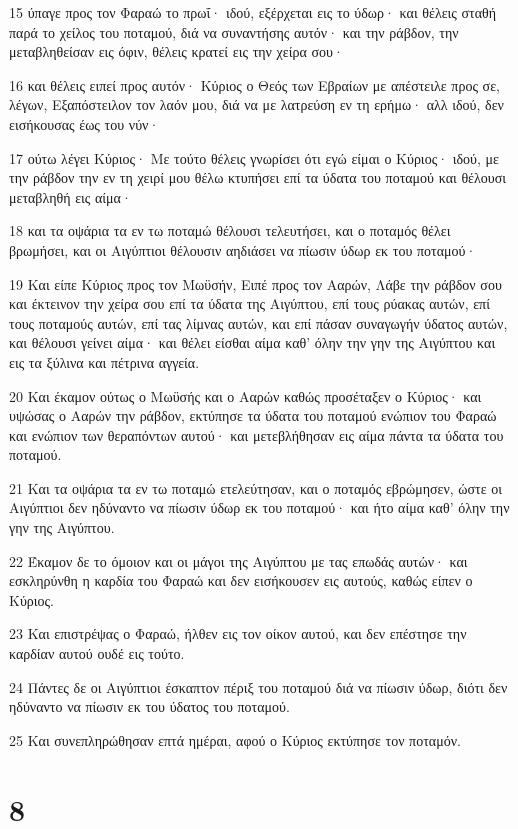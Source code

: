 \par 15 ύπαγε προς τον Φαραώ το πρωΐ· ιδού, εξέρχεται εις το ύδωρ· και θέλεις σταθή παρά το χείλος του ποταμού, διά να συναντήσης αυτόν· και την ράβδον, την μεταβληθείσαν εις όφιν, θέλεις κρατεί εις την χείρα σου·
\par 16 και θέλεις ειπεί προς αυτόν· Κύριος ο Θεός των Εβραίων με απέστειλε προς σε, λέγων, Εξαπόστειλον τον λαόν μου, διά να με λατρεύση εν τη ερήμω· αλλ ιδού, δεν εισήκουσας έως του νύν·
\par 17 ούτω λέγει Κύριος· Με τούτο θέλεις γνωρίσει ότι εγώ είμαι ο Κύριος· ιδού, με την ράβδον την εν τη χειρί μου θέλω κτυπήσει επί τα ύδατα του ποταμού και θέλουσι μεταβληθή εις αίμα·
\par 18 και τα οψάρια τα εν τω ποταμώ θέλουσι τελευτήσει, και ο ποταμός θέλει βρωμήσει, και οι Αιγύπτιοι θέλουσιν αηδιάσει να πίωσιν ύδωρ εκ του ποταμού·
\par 19 Και είπε Κύριος προς τον Μωϋσήν, Ειπέ προς τον Ααρών, Λάβε την ράβδον σου και έκτεινον την χείρα σου επί τα ύδατα της Αιγύπτου, επί τους ρύακας αυτών, επί τους ποταμούς αυτών, επί τας λίμνας αυτών, και επί πάσαν συναγωγήν ύδατος αυτών, και θέλουσι γείνει αίμα· και θέλει είσθαι αίμα καθ' όλην την γην της Αιγύπτου και εις τα ξύλινα και πέτρινα αγγεία.
\par 20 Και έκαμον ούτως ο Μωϋσής και ο Ααρών καθώς προσέταξεν ο Κύριος· και υψώσας ο Ααρών την ράβδον, εκτύπησε τα ύδατα του ποταμού ενώπιον του Φαραώ και ενώπιον των θεραπόντων αυτού· και μετεβλήθησαν εις αίμα πάντα τα ύδατα του ποταμού.
\par 21 Και τα οψάρια τα εν τω ποταμώ ετελεύτησαν, και ο ποταμός εβρώμησεν, ώστε οι Αιγύπτιοι δεν ηδύναντο να πίωσιν ύδωρ εκ του ποταμού· και ήτο αίμα καθ' όλην την γην της Αιγύπτου.
\par 22 Έκαμον δε το όμοιον και οι μάγοι της Αιγύπτου με τας επωδάς αυτών· και εσκληρύνθη η καρδία του Φαραώ και δεν εισήκουσεν εις αυτούς, καθώς είπεν ο Κύριος.
\par 23 Και επιστρέψας ο Φαραώ, ήλθεν εις τον οίκον αυτού, και δεν επέστησε την καρδίαν αυτού ουδέ εις τούτο.
\par 24 Πάντες δε οι Αιγύπτιοι έσκαπτον πέριξ του ποταμού διά να πίωσιν ύδωρ, διότι δεν ηδύναντο να πίωσιν εκ του ύδατος του ποταμού.
\par 25 Και συνεπληρώθησαν επτά ημέραι, αφού ο Κύριος εκτύπησε τον ποταμόν.

\chapter{8}


